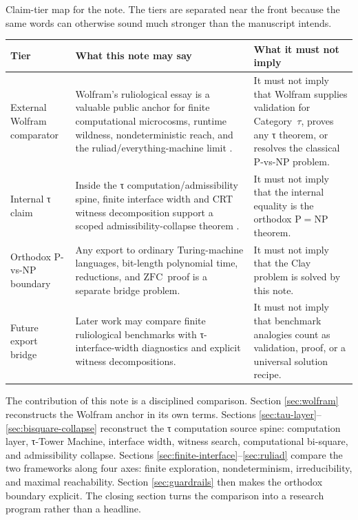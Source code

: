 \documentclass{pantarhei-researchnote}
\newcommand{\ZFC}{\ensuremath{\mathrm{ZFC}}}
\newcommand{\ClassP}{\ensuremath{\mathrm{P}}}
\newcommand{\ClassNP}{\ensuremath{\mathrm{NP}}}
\newcommand{\CategoryTau}{Category~\(\tau\)}
\begin{document}
\begin{widetable}[t]
\caption{Claim-tier map for the note. The tiers are separated near the
front because the same words can otherwise sound much stronger than the
manuscript intends.}
\label{tab:claim-tiers}
\prtablefont
\begin{tabularx}{\textwidth}{p{}Y Y}
\toprule
\textbf{Tier} & \textbf{What this note may say} & \textbf{What it must not imply} \\
\midrule
External Wolfram comparator & Wolfram's ruliological essay is a
valuable public anchor for finite computational microcosms, runtime
wildness, nondeterministic reach, and the ruliad/everything-machine
limit \cite{Wolfram2026RuliologicalPNP,WolframInstituteRuliology}. &
It must not imply that Wolfram supplies validation for \CategoryTau,
proves any τ theorem, or resolves the classical P-vs-NP problem. \\
Internal τ claim & Inside the τ computation/admissibility spine, finite
interface width and CRT witness decomposition support a scoped
admissibility-collapse theorem \cite{PR-III}. & It must not imply that
the internal equality is the orthodox
\(\ClassP=\ClassNP\) theorem. \\
Orthodox P-vs-NP boundary & Any export to ordinary Turing-machine
languages, bit-length polynomial time, reductions, and \ZFC\ proof is a
separate bridge problem. & It must not imply that the Clay problem is
solved by this note. \\
Future export bridge & Later work may compare finite ruliological
benchmarks with τ-interface-width diagnostics and explicit witness
decompositions. & It must not imply that benchmark analogies count as
validation, proof, or a universal solution recipe. \\
\bottomrule
\end{tabularx}
\end{widetable}

The contribution of this note is a disciplined comparison. Section
\ref{sec:wolfram} reconstructs the Wolfram anchor in its own terms.
Sections \ref{sec:tau-layer}--\ref{sec:bisquare-collapse} reconstruct the
τ computation source spine: computation layer, τ-Tower Machine, interface
width, witness search, computational bi-square, and admissibility
collapse. Sections \ref{sec:finite-interface}--\ref{sec:ruliad} compare
the two frameworks along four axes: finite exploration, nondeterminism,
irreducibility, and maximal reachability. Section \ref{sec:guardrails}
then makes the orthodox boundary explicit. The closing section turns the
comparison into a research program rather than a headline.
\end{document}
